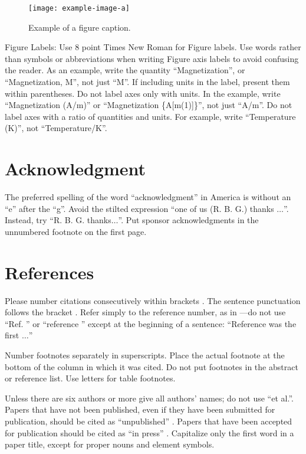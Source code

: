\documentclass[conference]{IEEEtran}
\begin{document}
\begin{figure}[htbp]
\centerline{\texttt{[image: example-image-a]}}
\caption{Example of a figure caption.}
\label{fig}
\end{figure}

Figure Labels: Use 8 point Times New Roman for Figure labels. Use words 
rather than symbols or abbreviations when writing Figure axis labels to 
avoid confusing the reader. As an example, write the quantity 
``Magnetization'', or ``Magnetization, M'', not just ``M''. If including 
units in the label, present them within parentheses. Do not label axes only 
with units. In the example, write ``Magnetization (A/m)'' or ``Magnetization 
\{A[m(1)]\}'', not just ``A/m''. Do not label axes with a ratio of 
quantities and units. For example, write ``Temperature (K)'', not 
``Temperature/K''.

\section*{Acknowledgment}

The preferred spelling of the word ``acknowledgment'' in America is without 
an ``e'' after the ``g''. Avoid the stilted expression ``one of us (R. B. 
G.) thanks $\ldots$''. Instead, try ``R. B. G. thanks$\ldots$''. Put sponsor 
acknowledgments in the unnumbered footnote on the first page.

\section*{References}

Please number citations consecutively within brackets \cite{b1}. The 
sentence punctuation follows the bracket \cite{b2}. Refer simply to the reference 
number, as in \cite{b3}---do not use ``Ref. \cite{b3}'' or ``reference \cite{b3}'' except at 
the beginning of a sentence: ``Reference \cite{b3} was the first $\ldots$''

Number footnotes separately in superscripts. Place the actual footnote at 
the bottom of the column in which it was cited. Do not put footnotes in the 
abstract or reference list. Use letters for table footnotes.

Unless there are six authors or more give all authors' names; do not use 
``et al.''. Papers that have not been published, even if they have been 
submitted for publication, should be cited as ``unpublished'' \cite{b4}. Papers 
that have been accepted for publication should be cited as ``in press'' \cite{b5}. 
Capitalize only the first word in a paper title, except for proper nouns and 
element symbols.
\end{document}
